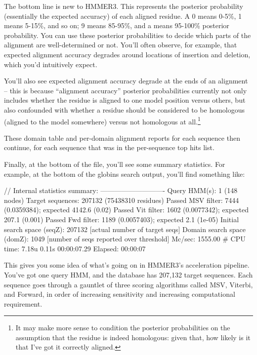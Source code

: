 The bottom line is new to HMMER3. This represents the posterior
probability (essentially the expected accuracy) of each aligned
residue. A 0 means 0-5\%, 1 means 5-15\%, and so on; 9 means 85-95\%,
and a \prog{*} means 95-100\% posterior probability. You can use these
posterior probabilities to decide which parts of the alignment are
well-determined or not. You'll often observe, for example, that
expected alignment accuracy degrades around locations of insertion and
deletion, which you'd intuitively expect. 

You'll also see expected alignment accuracy degrade at the ends of an
alignment -- this is because ``alignment accuracy'' posterior
probabilities currently not only includes whether the residue is
aligned to one model position versus others, but also confounded with
whether a residue should be considered to be homologous (aligned to
the model somewhere) versus not homologous at all.\footnote{It may
make more sense to condition the posterior probabilities on the
assumption that the residue is indeed homologous: given that, how
likely is it that I've got it correctly aligned.}


These domain table and per-domain alignment reports for each sequence
then continue, for each sequence that was in the per-sequence top hits
list.

Finally, at the bottom of the file, you'll see some summary
statistics.  For example, at the bottom of the globins search output,
you'll find something like:

\begin{sreoutput}
//
Internal statistics summary:
----------------------------
Query HMM(s):                              1  (148 nodes)
Target sequences:                     207132  (75438310 residues)
Passed MSV filter:                      7444  (0.0359384); expected 4142.6 (0.02)
Passed Vit filter:                      1602  (0.0077342); expected 207.1 (0.001)
Passed Fwd filter:                      1189  (0.0057403); expected 2.1 (1e-05)
Initial search space (seqZ):          207132  [actual number of target seqs]
Domain search space  (domZ):            1049  [number of seqs reported over threshold]
Mc/sec:                              1555.00
# CPU time: 7.18u 0.11s 00:00:07.29 Elapsed: 00:00:07
\end{sreoutput}

This gives you some idea of what's going on in HMMER3's acceleration
pipeline. You've got one query HMM, and the database has 207,132
target sequences. Each sequence goes through a gauntlet of three
scoring algorithms called MSV, Viterbi, and Forward, in order of 
increasing sensitivity and increasing computational requirement. 

